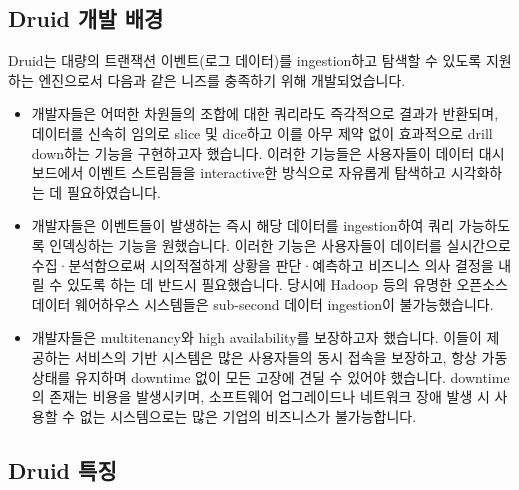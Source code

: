 \documentclass[letterpaper,10pt,english]{sphinxmanual}
\begin{document}
\subsection{Druid 개발 배경}
\label{\detokenize{discovery/part01/druid_background:druid}}\label{\detokenize{discovery/part01/druid_background::doc}}
Druid는 대량의 트랜잭션 이벤트(로그 데이터)를 ingestion하고 탐색할 수 있도록 지원하는 엔진으로서 다음과 같은 니즈를 충족하기 위해 개발되었습니다.
\begin{itemize}
\item {} 
개발자들은 어떠한 차원들의 조합에 대한 쿼리라도 즉각적으로 결과가 반환되며, 데이터를 신속히 임의로 slice 및 dice하고 이를 아무 제약 없이 효과적으로 drill down하는 기능을 구현하고자 했습니다. 이러한 기능들은 사용자들이 데이터 대시보드에서 이벤트 스트림들을 interactive한 방식으로 자유롭게 탐색하고 시각화하는 데 필요하였습니다.

\item {} 
개발자들은 이벤트들이 발생하는 즉시 해당 데이터를 ingestion하여 쿼리 가능하도록 인덱싱하는 기능을 원했습니다. 이러한 기능은 사용자들이 데이터를 실시간으로 수집·분석함으로써 시의적절하게 상황을 판단·예측하고 비즈니스 의사 결정을 내릴 수 있도록 하는 데 반드시 필요했습니다. 당시에 Hadoop 등의 유명한 오픈소스 데이터 웨어하우스 시스템들은 sub-second 데이터 ingestion이 불가능했습니다.

\item {} 
개발자들은 multitenancy와 high availability를 보장하고자 했습니다. 이들이 제공하는 서비스의 기반 시스템은 많은 사용자들의 동시 접속을 보장하고, 항상 가동 상태를 유지하며 downtime 없이 모든 고장에 견딜 수 있어야 했습니다. downtime의 존재는 비용을 발생시키며, 소프트웨어 업그레이드나 네트워크 장애 발생 시 사용할 수 없는 시스템으로는 많은 기업의 비즈니스가 불가능합니다.

\end{itemize}


\subsection{Druid 특징}
\label{\detokenize{discovery/part01/druid_features:druid}}\label{\detokenize{discovery/part01/druid_features::doc}}
\end{document}

